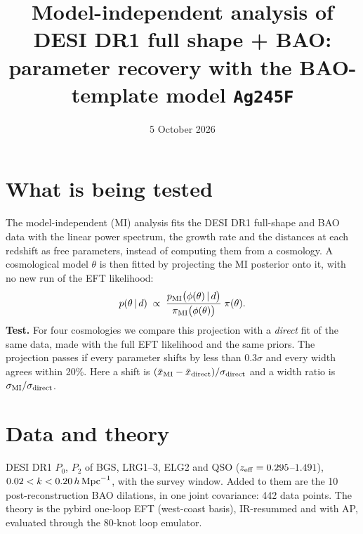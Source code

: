 \documentclass[11pt]{article}
\title{Model-independent analysis of DESI DR1 full shape + BAO:\\ parameter recovery with the BAO-template model \texttt{Ag245F}}
\date{5 October 2026}
\begin{document}
\maketitle

\section*{What is being tested}
The model-independent (MI) analysis fits the DESI DR1 full-shape and BAO data with the linear power spectrum, the growth
rate and the distances at each redshift as free parameters, instead of computing them from a cosmology. A cosmological
model $\theta$ is then fitted by projecting the MI posterior onto it, with no new run of the EFT likelihood:
\[
p(\theta\,|\,d)\;\propto\;\frac{p_{\rm MI}\big(\phi(\theta)\,|\,d\big)}{\pi_{\rm MI}\big(\phi(\theta)\big)}\;\pi(\theta).
\]
\textbf{Test.} For four cosmologies we compare this projection with a \emph{direct} fit of the same data, made with the
full EFT likelihood and the same priors. The projection passes if every parameter shifts by less than $0.3\sigma$ and every
width agrees within 20\%. Here a shift is $(\bar x_{\rm MI}-\bar x_{\rm direct})/\sigma_{\rm direct}$ and a width ratio is
$\sigma_{\rm MI}/\sigma_{\rm direct}$.

\section*{Data and theory}
DESI DR1 $P_0$, $P_2$ of BGS, LRG1--3, ELG2 and QSO ($z_{\rm eff}=0.295$--$1.491$), $0.02<k<0.20\,h\,{\rm Mpc}^{-1}$, with
the survey window. Added to them are the 10 post-reconstruction BAO dilations, in one joint covariance: 442 data points.
The theory is the pybird one-loop EFT (west-coast basis), IR-resummed and with AP, evaluated through the 80-knot loop
emulator.
\end{document}
